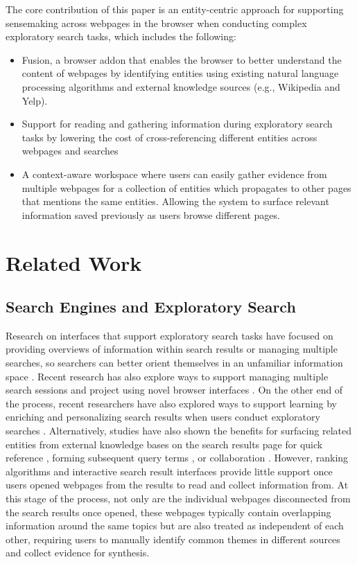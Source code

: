 The core contribution of this paper is an entity-centric approach for supporting sensemaking across webpages in the browser when conducting complex exploratory search tasks, which includes the following:

\begin{itemize}
\item Fusion, a browser addon that enables the browser to better understand the content of webpages by identifying entities using existing natural language processing algorithms and external knowledge sources (e.g., Wikipedia and Yelp).
\item Support for reading and gathering information during exploratory search tasks by lowering the cost of cross-referencing different entities across webpages and searches
\item A context-aware workspace where users can easily gather evidence from multiple webpages for a collection of entities which propagates to other pages that mentions the same entities. Allowing the system to surface relevant  information saved previously as users browse different pages.
\end{itemize}


\section{Related Work}

\subsection{Search Engines and Exploratory Search}

Research on interfaces that support exploratory search tasks have focused on providing overviews of information within search results or managing multiple searches, so searchers can better orient themselves in an unfamiliar information space \cite{hearst2009search,marchionini2000agileviews,patterson2001predicting,tretter2013searchpanel,morris2008searchbar}. Recent research has also explore ways to support managing multiple search sessions and project using novel browser interfaces \cite{hahn2018bento}. On the other end of the process, recent researchers have also explored ways to support learning by enriching and personalizing  search results when users conduct exploratory searches \cite{syed2017optimizing}. Alternatively, studies have also shown the benefits for surfacing related entities from external knowledge bases on the search results page for quick reference \cite{bota,miliaraki2015selena}, forming subsequent query terms \cite{klouche2015designing}, or collaboration \cite{andolina2018querytogether,klouche2018hyperlinks}. However, ranking algorithms and interactive search result interfaces provide little support once users opened webpages from the results to read and collect information from. At this stage of the process, not only are the individual webpages disconnected from the search results once opened, these webpages typically contain overlapping information around the same topics but are also treated as independent of each other, requiring users to manually identify common themes in different sources and collect evidence for synthesis.


